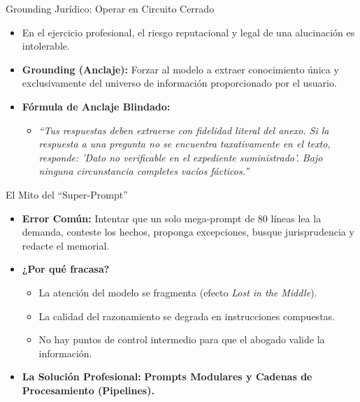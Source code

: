 \documentclass[aspectratio=169]{beamer}
\begin{document}
\begin{frame}{Grounding Jurídico: Operar en Circuito Cerrado}

\begin{itemize}
  \item En el ejercicio profesional, el riesgo reputacional y legal de una alucinación es intolerable.
  \item \textbf{Grounding (Anclaje):} Forzar al modelo a extraer conocimiento única y exclusivamente del universo de información proporcionado por el usuario.
  \item \textbf{Fórmula de Anclaje Blindado:}
  \begin{itemize}
    \item \textit{``Tus respuestas deben extraerse con fidelidad literal del anexo. Si la respuesta a una pregunta no se encuentra taxativamente en el texto, responde: 'Dato no verificable en el expediente suministrado'. Bajo ninguna circunstancia completes vacíos fácticos.''}
  \end{itemize}
\end{itemize}
\end{frame}

\begin{frame}{El Mito del ``Super-Prompt''}

\begin{itemize}
  \item \textbf{Error Común:} Intentar que un solo mega-prompt de 80 líneas lea la demanda, conteste los hechos, proponga excepciones, busque jurisprudencia y redacte el memorial.
  \item \textbf{¿Por qué fracasa?}
  \begin{itemize}
    \item La atención del modelo se fragmenta (efecto \textit{Lost in the Middle}).
    \item La calidad del razonamiento se degrada en instrucciones compuestas.
    \item No hay puntos de control intermedio para que el abogado valide la información.
  \end{itemize}
  \item \textbf{La Solución Profesional:} \textbf{Prompts Modulares y Cadenas de Procesamiento (Pipelines).}
\end{itemize}
\end{frame}
\end{document}
